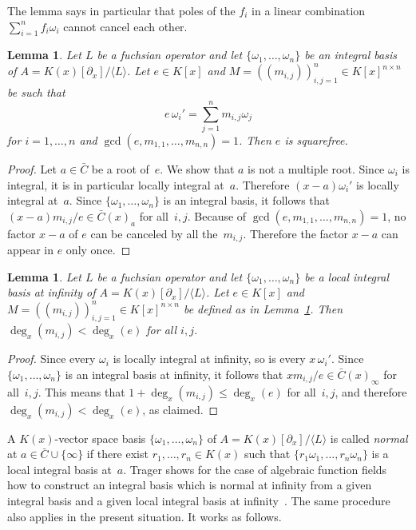 \documentclass{sig-alternate}
\newtheorem{lemma}[theorem]{Lemma}
\def\<#1>{\langle#1\rangle}
\begin{document}
The lemma says in particular that poles of the $f_i$ in a linear combination
$\sum_{i=1}^n f_i\omega_i$ cannot cancel each other.

\begin{lemma}\label{lemma:e}
  Let $L$ be a fuchsian operator and let
  $\{\omega_1,\dots,\omega_n\}$ be an integral basis of $A=K(x)[\partial_x]/\<L>$.
  Let $e\in K[x]$ and
  $M=((m_{i,j}))_{i,j=1}^n\in K[x]^{n\times n}$ be such that
  \[
    e\,\omega_i'=\sum_{j=1}^n m_{i,j}\omega_j
  \]
  for $i=1,\dots,n$ and $\gcd(e,m_{1,1},\dots,m_{n,n})=1$.
  Then $e$ is squarefree.
\end{lemma}
\begin{proof}
  Let $a\in\bar C$ be a root of~$e$. We show that $a$ is not a multiple root.
  Since $\omega_i$ is integral, it is in particular locally integral at~$a$.
  Therefore $(x-a)\omega_i'$ is locally integral at~$a$.
  Since $\{\omega_1,\dots,\omega_n\}$ is an integral basis, it follows that
  $(x-a)m_{i,j}/e\in\bar C(x)_a$ for all~$i,j$.
  Because of $\gcd(e,m_{1,1},\dots,m_{n,n})=1$, no factor $x-a$ of $e$
  can be canceled by all the~$m_{i,j}$.
  Therefore the factor $x-a$ can appear in $e$ only once.
\end{proof}

\begin{lemma} \label{lemma:degM}
  Let $L$ be a fuchsian operator and let $\{\omega_1,\dots,\omega_n\}$ be a local integral
  basis at infinity of $A=K(x)[\partial_x]/\<L>$. Let $e\in K[x]$ and $M=((m_{i,j}))_{i,j=1}^n\in K[x]^{n\times n}$
  be defined as in Lemma~\ref{lemma:e}. Then $\deg_x(m_{i,j})<\deg_x(e)$ for all $i,j$.
\end{lemma}
\begin{proof}
  Since every $\omega_i$ is locally integral at infinity, so is every $x\,\omega_i'$.
  Since $\{\omega_1,\dots,\omega_n\}$ is an integral basis at infinity, it follows that
  $xm_{i,j}/e\in\bar C(x)_\infty$ for all~$i,j$. This means that $1+\deg_x(m_{i,j})\leq\deg_x(e)$
  for all~$i,j$, and therefore $\deg_x(m_{i,j})<\deg_x(e)$, as claimed.
\end{proof}

A $K(x)$-vector space basis $\{\omega_1,\dots,\omega_n\}$ of $A=K(x)[\partial_x]/\<L>$ is
called \emph{normal} at $a\in\bar C\cup\{\infty\}$ if there exist $r_1,\dots,r_n\in
K(x)$ such that $\{r_1\omega_1,\dots,r_n\omega_n\}$ is a local integral basis
at~$a$. Trager shows for the case of algebraic function fields how to construct
an integral basis which is normal at infinity from a given integral basis and
a given local integral basis at infinity~\cite{trager84}. The same procedure also applies
in the present situation. It works as follows.
\end{document}
